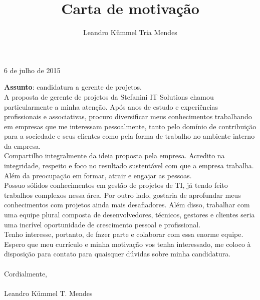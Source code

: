 \documentclass[a4paper,10pt]{article}
\title{Carta de motivação}
\author{Leandro Kümmel Tria Mendes}
\begin{document}
\begin{flushright} 
6 de julho de 2015
\end{flushright}
\textbf{Assunto}: candidatura a gerente de projetos.\\

   A proposta de gerente de projetos da Stefanini IT Solutions chamou particularmente a minha atenção. Após anos de estudo e
experiências profissionais e associativas, procuro diversificar meus conhecimentos trabalhando em empresas que me interessam pessoalmente, 
tanto pelo domínio de contribuição para a sociedade e seus clientes 
como pela forma de trabalho no ambiente interno da empresa.\\

Compartilho integralmente da ideia proposta pela empresa. Acredito na
integridade, respeito e foco no resultado sustentável com que a empresa trabalha.
Além da preocupação em formar, atrair e engajar as pessoas.\\

Possuo sólidos conhecimentos em gestão de projetos de TI, já tendo feito trabalhos complexos 
nessa área. Por outro lado, gostaria de aprofundar meus conhecimentos com projetos ainda mais desafiadores.
Além disso, trabalhar com uma equipe plural composta de
desenvolvedores, técnicos, gestores e clientes seria uma incrível oportunidade
de crescimento pessoal e profissional.\\

Tenho interesse, portanto, de fazer parte e colaborar com essa enorme equipe.
Espero que meu currículo e minha motivação vos tenha interessado, me
coloco à disposição para contato para quaisquer dúvidas sobre minha
candidatura.\\
\\
Cordialmente,\\
\\
Leandro Kümmel T. Mendes
\end{document}
